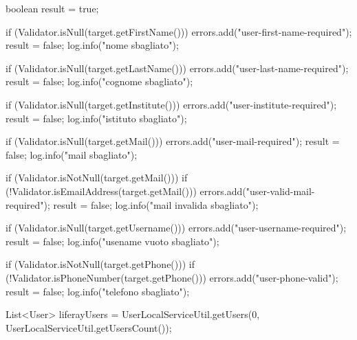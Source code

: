 \begin{DoxyCode}
                                               {
                boolean result = true;

                if (Validator.isNull(target.getFirstName())) {
                        errors.add("user-first-name-required");
                        result = false;
                        log.info("nome sbagliato");
                }

                if (Validator.isNull(target.getLastName())) {
                        errors.add("user-last-name-required");
                        result = false;
                        log.info("cognome sbagliato");
                }

                if (Validator.isNull(target.getInstitute())) {
                        errors.add("user-institute-required");
                        result = false;
                        log.info("istituto sbagliato");
                }

                if (Validator.isNull(target.getMail())) {
                        errors.add("user-mail-required");
                        result = false;
                        log.info("mail sbagliato");
                }

                if (Validator.isNotNull(target.getMail())) {
                        if (!Validator.isEmailAddress(target.getMail())) {
                                errors.add("user-valid-mail-required");
                                result = false;
                                log.info("mail invalida sbagliato");
                        }
                }

                if (Validator.isNull(target.getUsername())) {
                        errors.add("user-username-required");
                        result = false;
                        log.info("usename vuoto sbagliato");
                }

                if (Validator.isNotNull(target.getPhone())) {
                        if (!Validator.isPhoneNumber(target.getPhone())) {
                                errors.add("user-phone-valid");
                                result = false;
                                log.info("telefono sbagliato");
                        }
                }

                List<User> liferayUsers = UserLocalServiceUtil.getUsers(0,
                                UserLocalServiceUtil.getUsersCount());

}
\end{DoxyCode}
